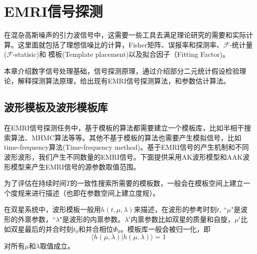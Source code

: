 \chapter{EMRI信号探测}

在混杂高斯噪声的引力波信号中，这需要一些工具去满足理论研究的需要和实际计算。这里面就包括了理想信噪比的计算，Fisher矩阵、误报率和探测率、$\mathcal{F}$-统计量($\mathcal{F}$-statisic)和
模板(Template placement)以及拟合因子（Fitting Factor)\cite{jaranowski2012gravitational}\cite{cutler1994gravitational}。

本章介绍数字信号处理基础，信号探测原理，通过介绍部分二元统计假设检验理论，解释探测算法原理，给出现有EMRI信号探测算法，和参数估计算法。

\section{波形模板及波形模板库}
在EMRI信号探测任务中，基于模板的算法都需要建立一个模板库，比如半相干搜索算法、MHMC算法等等。其他不基于模板的算法也需要产生模拟信号，比如time-frequency算法(Time-frequency method)。基于EMRI信号的产生机制和不同波形波形，我们产生不同数量的EMRI信号。下面提供采用AK波形模型和AAK波形模型来产生EMRI信号的源参数取值范围。

为了评估在持续时间$T$的一致性搜索所需要的模板数，一般会在模板空间上建立一个度规来进行描述（也即在参数空间上建立度规）\cite{owen1996search,balasubramanian1996erratum}。


在双星系统中，波形模板一般用$h(t,\mu,\lambda)$来描述，在波形的参考时刻$t$, ``$\mu$"是波形的外禀参数，``$\lambda$"是波形的内禀参数。$\lambda^i$内禀参数比如双星的质量和自旋，$\mu^i$比如双星最后的并合时刻$t_0$和并合相位$\Phi_0$。模板库一般会被归一化，即\cite{owen1996search}
\begin{equation}
\langle h(\mu,\lambda) |  h(\mu,\lambda) \rangle = 1
\end{equation}
对所有$\mu$和$\lambda$取值成立。

